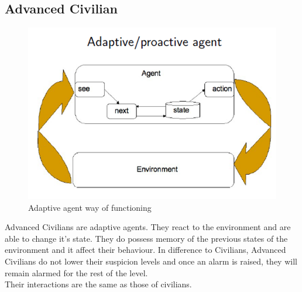 \documentclass[12pt]{article}
\begin{document}
\subsection{Advanced Civilian}
\begin{figure}[h]
\includegraphics[scale=1]{Picture7.png}
\centering
\caption{Adaptive agent way of functioning}
\end{figure}
Advanced Civilians are adaptive agents. They react to the environment and are able to change it's state. They do possess memory of the previous states of the environment and it affect their behaviour. In difference to Civilians, Advanced Civilians do not lower their suspicion levels and once an alarm is raised, they will remain alarmed for the rest of the level.\\
Their interactions are the same as those of civilians.
\newpage
\end{document}
